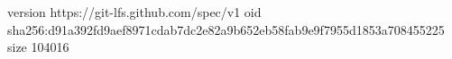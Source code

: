 version https://git-lfs.github.com/spec/v1
oid sha256:d91a392fd9aef8971cdab7dc2e82a9b652eb58fab9e9f7955d1853a708455225
size 104016
